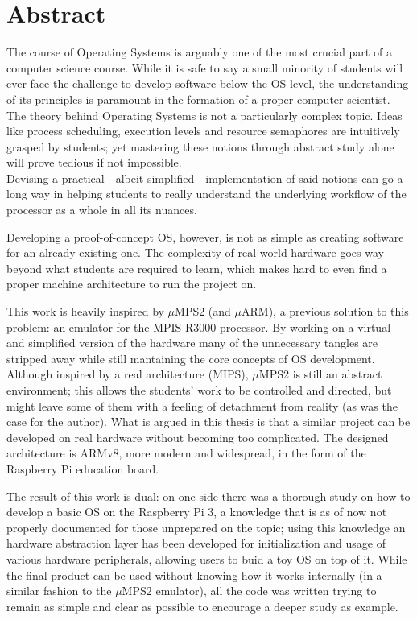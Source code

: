 \documentclass[12pt,a4paper,openright,twoside]{report}
\begin{document}
\chapter*{Abstract}                 %
The course of Operating Systems is arguably one of the most crucial part of 
a computer science course. While it is safe to say a small minority of students
will ever face the challenge to develop software below the OS level, the 
understanding of its principles is paramount in the formation of a proper computer
scientist.
The theory behind Operating Systems is not a particularly complex topic. Ideas 
like process scheduling, execution levels and resource semaphores are intuitively
grasped by students; yet mastering these notions through abstract study alone
will prove tedious if not impossible.\\
Devising a practical - albeit simplified - implementation of said notions can
go a long way in helping students to really understand the underlying workflow
of the processor as a whole in all its nuances. 

Developing a proof-of-concept OS, however, is not as simple as creating software for
an already existing one. The complexity of real-world hardware
 goes way beyond what students are required to learn, which makes hard to
 even find a proper machine architecture to run the project on.

This work is heavily inspired by $\mu$MPS2 (and $\mu$ARM), a previous solution to this problem:
 an emulator for the MPIS R3000 processor. By working on a virtual and simplified
 version of the hardware many of the unnecessary tangles are stripped away while
 still mantaining the core concepts of OS development.
Although inspired by a real architecture (MIPS), $\mu$MPS2 is still an abstract 
environment; this allows the students' work to be controlled and directed,
 but might leave some of them with a feeling of detachment from reality
 (as was the case for the author).
What is argued in this thesis is that a similar project can be developed
on real hardware without becoming too complicated. The designed architecture
is ARMv8, more modern and widespread, in the form of the Raspberry Pi education
board.

The result of this work is dual: on one side there was a thorough study on
how to develop a basic OS on the Raspberry Pi 3, a knowledge that is
as of now not properly documented for those unprepared on the topic; using
this knowledge an hardware abstraction layer has been developed for 
initialization and usage of various hardware peripherals, allowing users
to buid a toy OS on top of it.
While the final product can be used without knowing how it works internally 
(in a similar fashion to the $\mu$MPS2 emulator), all the code was written 
trying to remain as simple and clear as possible to encourage a deeper study
as example.
\end{document}
